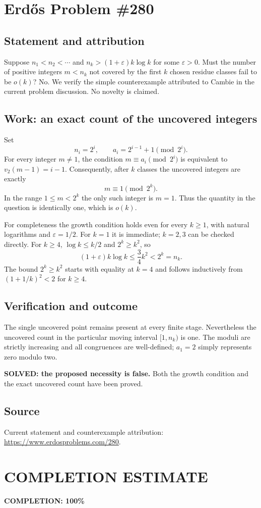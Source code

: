 \section{Erd\H{o}s Problem \#280}
\subsection{Statement and attribution}
Suppose $n_1<n_2<\cdots$ and $n_k>(1+\varepsilon)k\log k$ for some $\varepsilon>0$. Must the number of positive integers $m<n_k$ not covered by the first $k$ chosen residue classes fail to be $o(k)$? No. We verify the simple counterexample attributed to Cambie in the current problem discussion. No novelty is claimed.

\subsection{Work: an exact count of the uncovered integers}
Set
\[
 n_i=2^i,\qquad a_i=2^{i-1}+1\pmod{2^i}.
\]
For every integer $m\ne1$, the condition $m\equiv a_i\pmod{2^i}$ is equivalent to $v_2(m-1)=i-1$. Consequently, after $k$ classes the uncovered integers are exactly
\[
 m\equiv1\pmod{2^k}.
\]
In the range $1\le m<2^k$ the only such integer is $m=1$. Thus the quantity in the question is identically one, which is $o(k)$.

For completeness the growth condition holds even for every $k\ge1$, with natural logarithms and $\varepsilon=1/2$. For $k=1$ it is immediate; $k=2,3$ can be checked directly. For $k\ge4$, $\log k\le k/2$ and $2^k\ge k^2$, so
\[
 (1+\varepsilon)k\log k\le\frac34k^2<2^k=n_k.
\]
The bound $2^k\ge k^2$ starts with equality at $k=4$ and follows inductively from $(1+1/k)^2<2$ for $k\ge4$.

\subsection{Verification and outcome}
The single uncovered point remains present at every finite stage. Nevertheless the uncovered count in the particular moving interval $[1,n_k)$ is one. The moduli are strictly increasing and all congruences are well-defined; $a_1=2$ simply represents zero modulo two.

\textbf{SOLVED: the proposed necessity is false.} Both the growth condition and the exact uncovered count have been proved.

\subsection{Source}
Current statement and counterexample attribution: \url{https://www.erdosproblems.com/280}.
\section{COMPLETION ESTIMATE}
\textbf{COMPLETION: 100\%}
